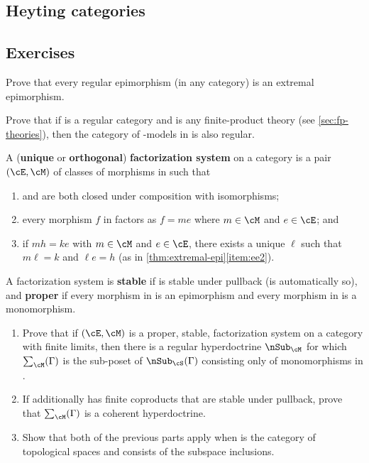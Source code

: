 \subsection{Heyting categories}
\label{sec:heyting-categories}



\subsection*{Exercises}

\begin{ex}\label{ex:regular-epis}
  Prove that every regular epimorphism (in any category) is an extremal epimorphism.
\end{ex}

\begin{ex}\label{ex:regular-egs}
  Prove that if \cS is a regular category and \cT is any finite-product theory (see \cref{sec:fp-theories}), then the category of \cT-models in \cS is also regular.
\end{ex}

\begin{ex}\label{ex:factsys}
  A (\textbf{unique} or \textbf{orthogonal}) \textbf{factorization system} on a category \cS is a pair $(\cE,\cM)$ of classes of morphisms in \cS such that
  \begin{enumerate}
  \item \cE and \cM are both closed under composition with isomorphisms;
  \item every morphism $f$ in \cS factors as $f=m e$ where $m\in\cM$ and $e\in\cE$; and
  \item if $m h = k e$ with $m\in\cM$ and $e\in \cE$, there exists a unique $\ell$ such that $m\ell=k$ and $\ell e = h$ (as in \cref{thm:extremal-epi}\ref{item:ee2}).
  \end{enumerate}
  A factorization system is \textbf{stable} if \cE is stable under pullback (\cM is automatically so), and \textbf{proper} if every morphism in \cE is an epimorphism and every morphism in \cM is a monomorphism.
  \begin{enumerate}
  \item Prove that if $(\cE,\cM)$ is a proper, stable, factorization system on a category \cS with finite limits, then there is a regular hyperdoctrine $\sub_\cM$ for which $\sum_\cM(\Gamma)$ is the sub-poset of $\sub_\cS(\Gamma)$ consisting only of monomorphisms in \cM.
  \item If \cS additionally has finite coproducts that are stable under pullback, prove that $\sum_\cM(\Gamma)$ is a coherent hyperdoctrine.
  \item Show that both of the previous parts apply when \cS is the category of topological spaces and \cM consists of the subspace inclusions.
  \end{enumerate}
\end{ex}

